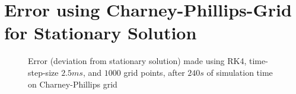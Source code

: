 \section{Error using Charney-Phillips-Grid for Stationary Solution}\label{sec:stationary_cp_error}
\begin{figure}[htpb]
    \caption{Error (deviation from stationary solution) made using RK4, time-step-size $2.5ms$, and $1000$ grid points, after $240s$ of simulation time on Charney-Phillips grid}
    \label{fig:cp_stat_err}
\end{figure}